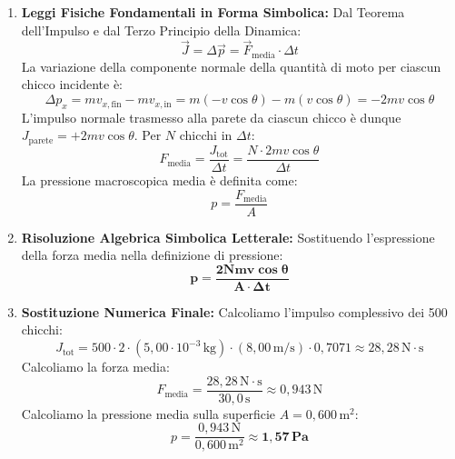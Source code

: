 \documentclass[11pt,a4paper,oneside]{report}
\begin{document}
\begin{problema}
\begin{enumerate}[label=\textbf{Fase \arabic*:}, leftmargin=*, itemsep=5pt]
\begin{center}
  \par{}
  \end{center}

  \item \textbf{Leggi Fisiche Fondamentali in Forma Simbolica:}
  Dal Teorema dell'Impulso e dal Terzo Principio della Dinamica:
  \[
  \vec{J} = \Delta \vec{p} = \vec{F}_{\text{media}} \cdot \Delta t
  \]
  La variazione della componente normale della quantit\`a di moto per ciascun chicco incidente \`e:
  \[
  \Delta p_x = m v_{x,\text{fin}} - m v_{x,\text{in}} = m(-v\cos\theta) - m(v\cos\theta) = -2 m v \cos\theta
  \]
  L'impulso normale trasmesso alla parete da ciascun chicco \`e dunque $J_{\text{parete}} = +2 m v \cos\theta$. Per $N$ chicchi in $\Delta t$:
  \[
  F_{\text{media}} = \frac{J_{\text{tot}}}{\Delta t} = \frac{N \cdot 2 m v \cos\theta}{\Delta t}
  \]
  La pressione macroscopica media \`e definita come:
  \[
  p = \frac{F_{\text{media}}}{A}
  \]

  \item \textbf{Risoluzione Algebrica Simbolica Letterale:}
  Sostituendo l'espressione della forza media nella definizione di pressione:
  \[
  \mathbf{p = \frac{2 N m v \cos\theta}{A \cdot \Delta t}}
  \]

  \item \textbf{Sostituzione Numerica Finale:}
  Calcoliamo l'impulso complessivo dei 500 chicchi:
  \[
  J_{\text{tot}} = 500 \cdot 2 \cdot (5{,}00 \cdot 10^{-3}\,\text{kg}) \cdot (8{,}00\,\text{m/s}) \cdot 0{,}7071 \approx 28{,}28\,\text{N}\cdot\text{s}
  \]
  Calcoliamo la forza media:
  \[
  F_{\text{media}} = \frac{28{,}28\,\text{N}\cdot\text{s}}{30{,}0\,\text{s}} \approx 0{,}943\,\text{N}
  \]
  Calcoliamo la pressione media sulla superficie $A = 0{,}600\,\text{m}^2$:
  \[
  p = \frac{0{,}943\,\text{N}}{0{,}600\,\text{m}^2} \approx \mathbf{1{,}57\,\text{Pa}}
  \]


\end{enumerate}
\end{problema}
\end{document}
